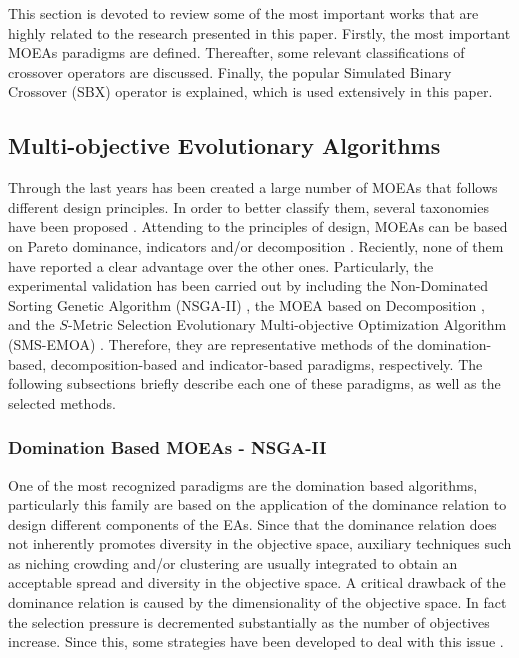 This section is devoted to review some of the most important works that are highly related to the research presented in this paper.
%
Firstly, the most important MOEAs paradigms are defined.
%
Thereafter, some relevant classifications of crossover operators are discussed.
%
Finally, the popular Simulated Binary Crossover (SBX) operator is explained, which is used extensively in this paper.

\subsection{Multi-objective Evolutionary Algorithms}

Through the last years has been created a large number of MOEAs that follows different design principles.
%
In order to better classify them, several taxonomies have been proposed \cite{Joel:BOOK_MOEAs}.
%
Attending to the principles of design, MOEAs can be based on Pareto dominance, indicators and/or decomposition \cite{pilat2010evolutionary}.
%
Reciently, none of them have reported a clear advantage over the other ones.
%
Particularly, the experimental validation has been carried out by including the Non-Dominated Sorting Genetic Algorithm (NSGA-II) \cite{Joel:NSGAII}, the MOEA based on Decomposition \cite{Joel:MOEAD}, and the $S$-Metric Selection Evolutionary Multi-objective Optimization Algorithm (SMS-EMOA) \cite{Joel:SMSEMOA}.
%
Therefore, they are representative methods of the domination-based, decomposition-based and indicator-based paradigms, respectively.
%
The following subsections briefly describe each one of these paradigms, as well as the selected methods.

\subsubsection{Domination Based MOEAs - NSGA-II}

One of the most recognized paradigms are the domination based algorithms, particularly this family are based on the application of the dominance relation to design different components of the EAs.
%
Since that the dominance relation does not inherently promotes diversity in the objective space, auxiliary techniques such as niching crowding and/or clustering are usually integrated to obtain an acceptable spread and diversity in the objective space.
%
A critical drawback of the dominance relation is caused by the dimensionality of the objective space.
%
In fact the selection pressure is decremented substantially as the number of objectives increase.
%
Since this, some strategies have been developed to deal with this issue \cite{horoba2008benefits}.

